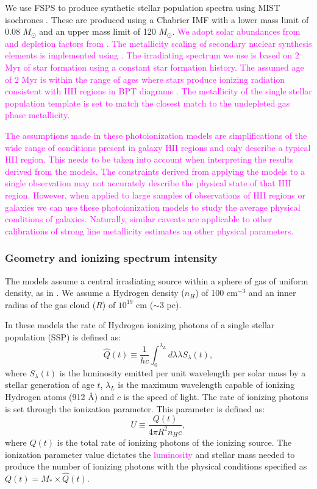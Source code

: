 \documentclass[fleqn,usenatbib]{mnras}
\begin{document}
We use FSPS to produce synthetic stellar population spectra \citep{conroy2009,conroy2010} using MIST isochrones \citep{choi2016}. These are produced using a Chabrier IMF \citep{chabrier2003} with a lower mass limit of 0.08 $M_\odot$ and an upper mass limit of 120 $M_\odot$. \textcolor{magenta}{We adopt solar abundances from \cite{grevesse2010} and depletion factors from \cite{dopita2013}. The metallicity scaling of secondary nuclear synthesis elements is implemented using \cite{vanzee1998}. The irradiating spectrum we use is based on 2 Myr of star formation using a constant star formation history. The assumed age of 2 Myr is within the range of ages where stars produce ionizing radiation consistent with HII regions in BPT diagrams \citep{byler2017}. The metallicity of the single stellar population template is set to match the closest match to the undepleted gas phase metallicity.}

\textcolor{magenta}{The assumptions made in these photoionization models are simplifications of the wide range of conditions present in galaxy HII regions and only describe a typical HII region. This needs to be taken into account when interpreting the results derived from the models. The constraints derived from applying the models to a single observation may not accurately describe the physical state of that HII region. However, when applied to large samples of observations of HII regions or galaxies we can use these photoionization models to study the average physical conditions of galaxies. Naturally, similar caveats are applicable to other calibrations of strong line metallicity estimates an other physical parameters.}

\subsubsection{Geometry and ionizing spectrum intensity}
The models assume a central irradiating source within a sphere of gas of uniform density, as in \cite{byler2017}. We assume a Hydrogen density ($n_H$) of 100 cm$^{-3}$ and an inner radius of the gas cloud ($R$) of $10^{19}$ cm ($\sim 3$ pc). 

In these models the rate of Hydrogen ionizing photons of a single stellar population (SSP) is defined as:
\begin{equation}
    \hat{Q}(t) \equiv \frac{1}{hc} \int_0^{\lambda_L} d\lambda \lambda S_{\lambda}(t) ,
\end{equation}
where $S_{\lambda}(t)$ is the luminosity emitted per unit wavelength per solar mass by a stellar generation of age $t$, $\lambda_{L}$ is the maximum wavelength capable of ionizing Hydrogen atoms (912 \AA) and $c$ is the speed of light. The rate of ionizing photons is set through the ionization parameter. This parameter is defined as:
\begin{equation}
    U \equiv \frac{Q(t)}{4 \pi R^2 n_H c},
\end{equation}
where $Q(t)$ is the total rate of ionizing photons of the ionizing source. The ionization parameter value dictates the \textcolor{magenta}{luminosity} and stellar mass needed to produce the number of ionizing photons with the physical conditions specified as $Q(t) = M_* \times \hat{Q}(t)$. 
\end{document}
